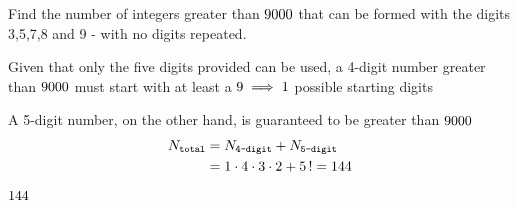 



\question[2] Find the number of integers greater than $9000$ that can be formed with the digits 3,5,7,8 and 9 - with
 no digits repeated.


\watchout

\begin{solution}[\mcq]
	Given that only the five digits provided can be used, a 4-digit number greater than $9000$ must start 
  with at least a $9 \implies 1$ possible starting digits

	A 5-digit number, on the other hand, is guaranteed to be greater than $9000$
	\begin{align}
		N_{\texttt{total}} &= N_{\texttt{4-digit}} + N_{\texttt{5-digit}} \\
		   &= 1\cdot 4\cdot 3 \cdot 2 + 5\,! = 144
	\end{align}
\end{solution}

\ifprintanswers
  \begin{codex}
    $144$
  \end{codex}
\fi 

